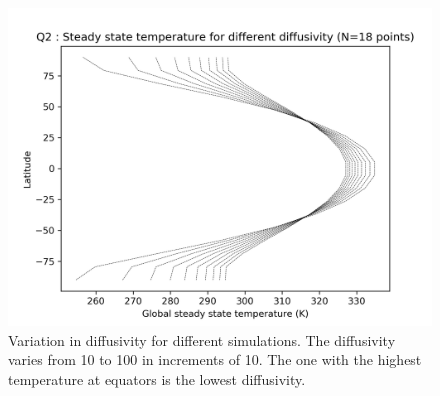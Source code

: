 \documentclass{article}
\begin{document}
\begin{figure}
\includegraphics[scale=0.7]{tdiff_q2b.png} 
\caption{Variation in diffusivity for different simulations. The diffusivity varies from 10 to 100 in increments of 10. The one with the highest temperature at equators is the lowest diffusivity.}
\end{figure}
\end{document}
